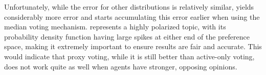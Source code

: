 Unfortunately, while the error for other distributions is relatively similar,
 yields considerably more error and starts accumulating
this error earlier when using the median voting mechanism.
 represents a highly polarized topic, with its probability
density function having large spikes at either end of the preference space, making it
extremely important to ensure results are fair and accurate.
This would indicate that proxy voting, while it is still better than active-only
voting, does not work quite as well when agents have stronger, opposing opinions.

%


